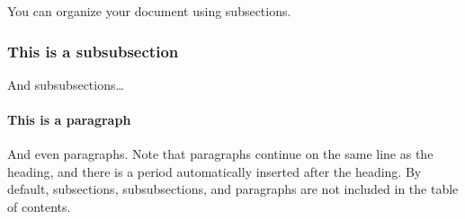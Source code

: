You can organize your document using subsections.

\subsubsection{This is a subsubsection}

And subsubsections\ldots

\paragraph{This is a paragraph}

And even paragraphs. Note that paragraphs continue on the same line as the heading, and there is a period automatically inserted after the heading. By default, subsections, subsubsections, and paragraphs are not included in the table of contents.